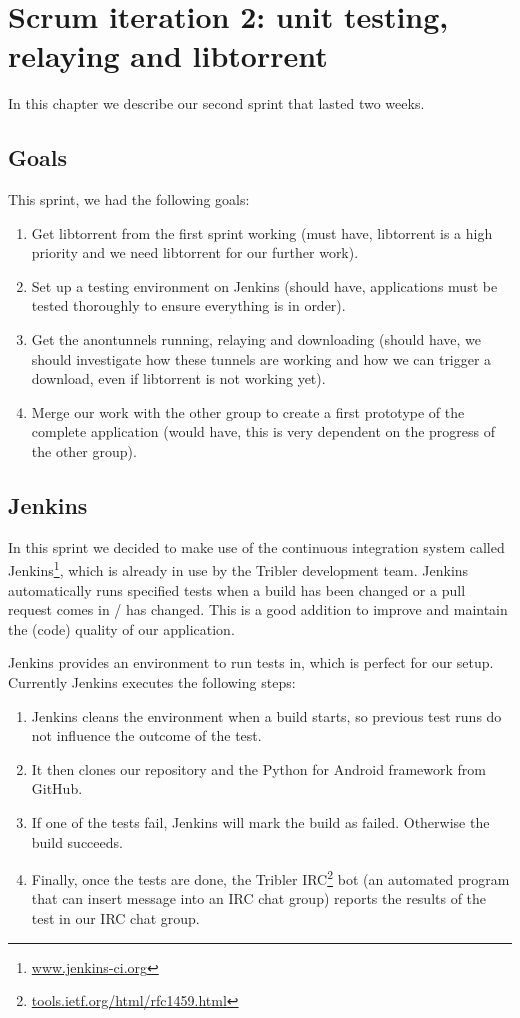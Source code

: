\chapter{Scrum iteration 2: unit testing, relaying and libtorrent}
\label{cpt:iteration2}
	In this chapter we describe our second sprint that lasted two weeks.

	\section{Goals}
		This sprint, we had the following goals:
	
		\begin{enumerate}
			\item Get libtorrent from the first sprint working (must have, libtorrent is a high priority and we need libtorrent for our further work).
			\item Set up a testing environment on Jenkins (should have, applications must be tested thoroughly to ensure everything is in order).
			\item Get the anontunnels running, relaying and downloading (should have, we should investigate how these tunnels are working and how we can trigger a download, even if libtorrent is not working yet).
			\item Merge our work with the other group to create a first prototype of the complete application (would have, this is very dependent on the progress of the other group).
		\end{enumerate}
	
	\section{Jenkins}
		\label{sec:jenkins}
		In this sprint we decided to make use of the continuous integration system called Jenkins\footnote{\href{http://jenkins-ci.org}{www.jenkins-ci.org}}, which is already in use by the Tribler development team. Jenkins automatically runs specified tests when a build has been changed or a pull request comes in / has changed. This is a good addition to improve and maintain the (code) quality of our application.
		
		Jenkins provides an environment to run tests in, which is perfect for our setup. Currently Jenkins executes the following steps:
		
		\begin{enumerate}
			\item Jenkins cleans the environment when a build starts, so previous test runs do not influence the outcome of the test.
			\item It then clones our repository and the Python for Android framework from GitHub.
			\item If one of the tests fail, Jenkins will mark the build as failed. Otherwise the build succeeds.
			\item Finally, once the tests are done, the Tribler IRC\footnote{\href{http://tools.ietf.org/html/rfc1459.html}{tools.ietf.org/html/rfc1459.html}} bot (an automated program that can insert message into an IRC chat group) reports the results of the test in our IRC chat group.
		\end{enumerate} 
		
